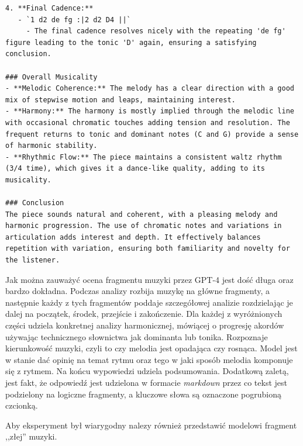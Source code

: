 \documentclass[data-science]{agh-wi} %
\begin{document}
\begin{verbatim}
4. **Final Cadence:**
   - `1 d2 de fg :|2 d2 D4 ||`
     - The final cadence resolves nicely with the repeating 'de fg' figure leading to the tonic 'D' again, ensuring a satisfying conclusion.

### Overall Musicality
- **Melodic Coherence:** The melody has a clear direction with a good mix of stepwise motion and leaps, maintaining interest.
- **Harmony:** The harmony is mostly implied through the melodic line with occasional chromatic touches adding tension and resolution. The frequent returns to tonic and dominant notes (C and G) provide a sense of harmonic stability.
- **Rhythmic Flow:** The piece maintains a consistent waltz rhythm (3/4 time), which gives it a dance-like quality, adding to its musicality.

### Conclusion
The piece sounds natural and coherent, with a pleasing melody and harmonic progression. The use of chromatic notes and variations in articulation adds interest and depth. It effectively balances repetition with variation, ensuring both familiarity and novelty for the listener.
\end{verbatim}

Jak można zauważyć ocena fragmentu muzyki przez GPT-4 jest dość długa oraz bardzo dokładna. Podczas analizy rozbija muzykę na główne fragmenty, a następnie każdy z tych fragmentów poddaje szczegółowej analizie rozdzielając je dalej na początek, środek, przejście i zakończenie. Dla każdej z wyróżnionych części udziela konkretnej analizy harmonicznej, mówiącej o progresję akordów używając technicznego słownictwa jak dominanta lub tonika. Rozpoznaje kierunkowość muzyki, czyli to czy melodia jest opadająca czy rosnąca. Model jest w stanie dać opinię na temat rytmu oraz tego w jaki sposób melodia komponuje się z rytmem. Na końcu wypowiedzi udziela podsumowania. Dodatkową zaletą, jest fakt, że odpowiedź jest udzielona w formacie \textit{markdown} przez co tekst jest podzielony na logiczne fragmenty, a kluczowe słowa są oznaczone pogrubioną czcionką.

Aby eksperyment był wiarygodny nalezy również przedstawić modelowi fragment ,,złej'' muzyki.
\end{document}
